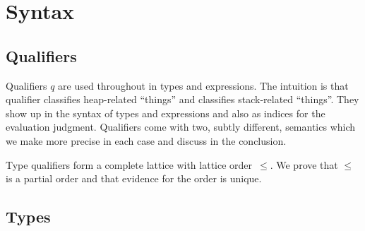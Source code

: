 \documentclass[sigplan,review,dvipsnames,screen,10pt]{acmart}
\begin{document}

\section{Syntax}
\label{sec:syntax}

\subsection{Qualifiers}
\label{sec:qualifiers}

Qualifiers $q$ are used throughout in types and
expressions. The intuition is that qualifier {\AOne} classifies heap-related ``things'' and {\ATwo} classifies
stack-related ``things''.  They show up in the syntax of
types and expressions and also as indices for the evaluation
judgment. Qualifiers come with two, subtly different, semantics which
we make more precise in each case and discuss in the conclusion.
\Qual

Type qualifiers form a complete lattice with lattice order~$\le$. We
prove that $\le$ is a partial order and that evidence for the order is unique.

\subsection{Types}
\label{sec:types}
\end{document}
